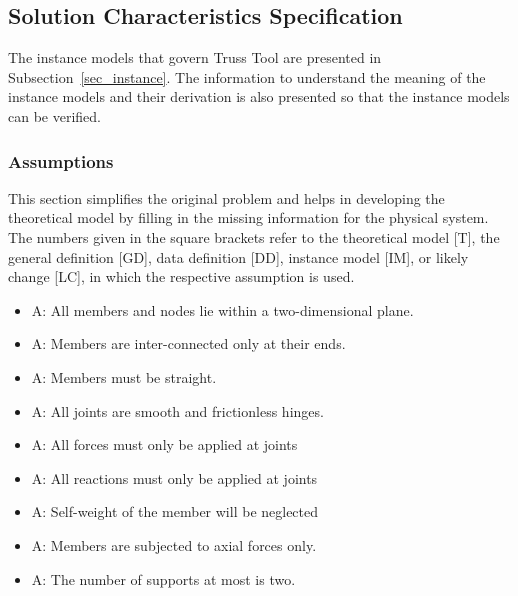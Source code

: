 \documentclass[12pt]{article}
\newcounter{assumpnum} %
\begin{document}
\subsection{Solution Characteristics Specification}
The instance models that govern Truss Tool are presented in
Subsection~\ref{sec_instance}.  The information to understand the meaning of the instance models and their derivation is also presented so that the instance models can be verified.

\subsubsection{Assumptions} \label{sec_assumpt}

This section simplifies the original problem and helps in developing the
theoretical model by filling in the missing information for the physical
system. The numbers given in the square brackets refer to the theoretical model
[T], the general definition [GD], data definition [DD], instance model [IM], or
likely change [LC], in which the respective assumption is used.

\begin{itemize}

\item{A\theassumpnum \label{planar}: All members and nodes lie within a two-dimensional plane.}

\item{A\theassumpnum \label{connection}: Members are inter-connected only at their ends.}
\item{A\theassumpnum \label{as_straight}: Members must be straight.}
\item{A\theassumpnum \label{frictionless}: All joints are smooth and frictionless hinges.}
\item{A\theassumpnum \label{Force_at_joints}: All forces must only be applied at joints}
\item{A\theassumpnum \label{reaction_at_joints}: All reactions must only be applied at joints}
\item{A\theassumpnum \label{self_w}: Self-weight of the member will be neglected}
\item{A\theassumpnum \label{axial_fmem}: Members are subjected to axial forces only.}
\item{A\theassumpnum \label{maxsupport}: The number of supports at most is two.}

\end{itemize}
\end{document}
